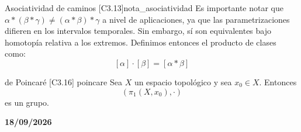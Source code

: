 \begin{nota}{Asociatividad de caminos [C3.13]}{nota_asociatividad}
Es importante notar que $\alpha * (\beta * \gamma) \neq (\alpha * \beta) * \gamma$ a nivel de aplicaciones, ya que las parametrizaciones difieren en los intervalos temporales. Sin embargo, sí son equivalentes bajo homotopía relativa a los extremos. 
Definimos entonces el producto de clases como:
\[ [\alpha] \cdot [\beta] = [\alpha * \beta] \]
\end{nota}

\begin{teorema}{de Poincaré [C3.16] \marcaT}{poincare}
Sea $X$ un espacio topológico y sea $x_0 \in X$. Entonces 
\[
(\pi_1(X, x_0), \cdot)
\]
es un grupo.
\end{teorema}

\textbf{18/09/2026}

